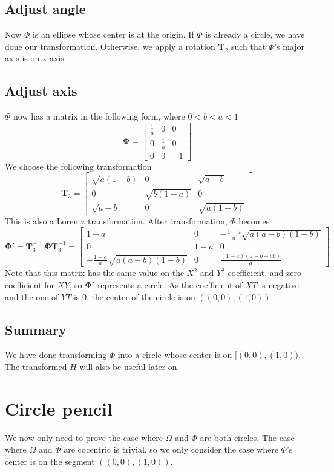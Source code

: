 \documentclass[]{article}
\begin{document}
\subsection{Adjust angle}
Now $\Phi$ is an ellipse whose center is at the origin. If $\Phi$ is already a circle, we have done our transformation. Otherwise, we apply a rotation $\mathbf{T}_2$ such that $\Phi$'s major axis is on x-axis.

\subsection{Adjust axis}
$\Phi$ now has a matrix in the following form, where $0 < b < a < 1$
\[
\mathbf{\Phi} = \left[\begin{matrix}
\frac{1}{a} & 0 & 0 \\ 0 & \frac{1}{b} & 0 \\ 0 & 0 & -1
\end{matrix}\right]
\]
We choose the following transformation
\[
\mathbf{T}_3 = \left[\begin{matrix}
\sqrt{a(1-b)} & 0 & \sqrt{a - b}\\
0 & \sqrt{b(1-a)} & 0\\
\sqrt{a - b} & 0 &\sqrt{a(1-b)} 
\end{matrix}\right]
\]
This is also a Lorentz transformation. After transformation, $\Phi$ becomes
\[
\mathbf{\Phi}' = \mathbf{T}_3^{-\intercal}\mathbf{\Phi}\mathbf{T}_3^{-1} = \left[\begin{matrix}
1-a & 0 & -\frac{1-a}{a}\sqrt{a(a-b)(1-b)} \\
0 & 1-a & 0\\
-\frac{1-a}{a}\sqrt{a(a-b)(1-b)} & 0 & \frac{(1-a)(a-b-ab)}{a}
\end{matrix}\right]
\]
Note that this matrix has the same value on the $X^2$ and $Y^2$ coefficient, and zero coefficient for $XY$, so $\mathbf{\Phi}'$ represents a circle. As the coefficient of $XT$ is negative and the one of $YT$ is 0, the center of the circle is on $((0, 0), (1, 0))$.

\subsection{Summary}
We have done transforming $\Phi$ into a circle whose center is on $[(0, 0), (1, 0))$. The transformed $H$ will also be useful later on.

\section{Circle pencil}
We now only need to prove the case where $\Omega$ and $\Phi$ are both circles. The case where $\Omega$ and $\Phi$ are cocentric is trivial, so we only consider the case where $\Phi$'s center is on the segment $((0, 0), (1, 0))$.
\end{document}

